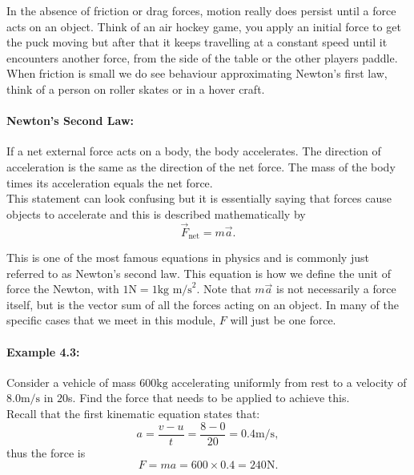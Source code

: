 \documentclass[a4paper,12pt]{book}
\begin{document}
In the absence of friction or drag forces, motion really does persist until a force acts on an object. Think of an air hockey game, you apply an initial force to get the puck moving but after that it keeps travelling at a constant speed until it encounters another force, from the side of the table or the other players paddle. When friction is small we do see behaviour approximating Newton's first law, think of a person on roller skates or in a hover craft.

\paragraph{Newton's Second Law:} If a net external force acts on a body, the body accelerates. The direction of acceleration is the same as the direction of the net force. The mass of the body times its acceleration equals the net force.\\

This statement can look confusing but it is essentially saying that forces cause objects to accelerate and this is described mathematically by
\begin{equation}
\vec{F}_{\text{net}}=m\vec{a}.
\label{eq: N2}
\end{equation}

This is one of the most famous equations in physics and is commonly just referred to as Newton's second law. This equation is how we define the unit of force the Newton, with $1 \text{N}=1\text{kg m/s}^{2}$.  Note that $m\vec{a}$ is not necessarily a force itself, but is the vector sum of all the forces acting on an object. In many of the specific cases that we meet in this module, $F$ will just be one force.

\paragraph{Example 4.3:} Consider a vehicle of mass $600\text{kg}$ accelerating uniformly from rest to a velocity of $8.0\text{m/s}$ in $20$s. Find the force that needs to be applied to achieve this.\\

Recall that the first kinematic equation states that:
\begin{equation*}
a=\frac{v-u}{t}=\frac{8-0}{20}=0.4\text{m/s},
\end{equation*}
thus the force is
\begin{equation*}
F=ma=600\times 0.4=240\text{N}.
\end{equation*}
\end{document}
